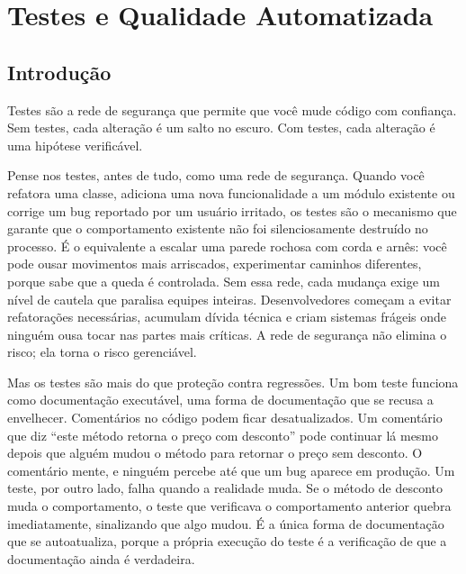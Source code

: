 \chapter{Testes e Qualidade Automatizada}

\section{Introdução}

Testes são a rede de segurança que permite que você mude código com confiança.
Sem testes, cada alteração é um salto no escuro. Com testes, cada alteração é
uma hipótese verificável.

Pense nos testes, antes de tudo, como uma rede de segurança. Quando você
refatora uma classe, adiciona uma nova funcionalidade a um módulo existente ou
corrige um bug reportado por um usuário irritado, os testes são o mecanismo que
garante que o comportamento existente não foi silenciosamente destruído no
processo. É o equivalente a escalar uma parede rochosa com corda e arnês:
você pode ousar movimentos mais arriscados, experimentar caminhos diferentes,
porque sabe que a queda é controlada. Sem essa rede, cada mudança exige um
nível de cautela que paralisa equipes inteiras. Desenvolvedores começam a evitar
refatorações necessárias, acumulam dívida técnica e criam sistemas frágeis onde
ninguém ousa tocar nas partes mais críticas. A rede de segurança não elimina
o risco; ela torna o risco gerenciável.

Mas os testes são mais do que proteção contra regressões. Um bom teste funciona
como documentação executável, uma forma de documentação que se recusa a
envelhecer. Comentários no código podem ficar desatualizados. Um comentário
que diz ``este método retorna o preço com desconto'' pode continuar lá mesmo
depois que alguém mudou o método para retornar o preço sem desconto. O
comentário mente, e ninguém percebe até que um bug aparece em produção. Um
teste, por outro lado, falha quando a realidade muda. Se o método de desconto
muda o comportamento, o teste que verificava o comportamento anterior quebra
imediatamente, sinalizando que algo mudou. É a única forma de documentação
que se autoatualiza, porque a própria execução do teste é a verificação de
que a documentação ainda é verdadeira.

